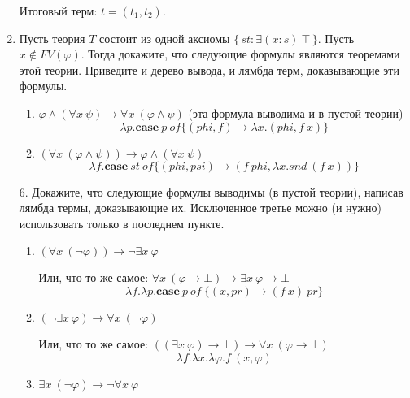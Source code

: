 \begin{enumerate}
Итоговый терм: $t = (t_1, t_2)$.

\item Пусть теория $T$ состоит из одной аксиомы $\{\,st : \exists (x : s)\ \top\,\}$.
    Пусть $x \notin FV(\varphi)$.
    Тогда докажите, что следующие формулы являются теоремами этой теории.
    Приведите и дерево вывода, и лямбда терм, доказывающие эти формулы.
\begin{enumerate}
\item $\varphi \land (\forall x\ \psi) \to \forall x\ (\varphi \land \psi)$ (эта формула выводима и в пустой 
теории)
\begin{equation*}
	\lambda p. \mathbf{case} \ p \ of \{ (phi, f) \to \lambda x.(phi, f \ x) \}
\end{equation*}
\item $(\forall x\ (\varphi \land \psi)) \to \varphi \land (\forall x\ \psi)$
\begin{equation*}
	\lambda f. \mathbf{case} \ st \ of \{ (phi, psi) \to (f\ phi, \lambda x. snd \ (f \ x)) \}
\end{equation*}
\end{enumerate}

\item[6.] Докажите, что следующие формулы выводимы (в пустой теории), написав лямбда термы, доказывающие их.
    Исключенное третье можно (и нужно) использовать только в последнем пункте.
\begin{enumerate}
\item $(\forall x\ (\neg \varphi)) \to \neg \exists x\ \varphi$

Или, что то же самое: $\forall x\ (\varphi \to \bot) \to \exists x\ \varphi \to \bot$
\begin{equation*}
	\lambda f.\lambda p. \mathbf{case} \ p \ of \ \{(x, pr) \to (f \ x) \ pr\}
\end{equation*}
\item $(\neg \exists x\ \varphi) \to \forall x\ (\neg \varphi)$

Или, что то же самое:  $((\exists x\ \varphi) \to \bot) \to \forall x\ (\varphi \to \bot)$
\begin{equation*}
	\lambda f.\lambda x. \lambda \varphi .f \ (x, \varphi) 
\end{equation*}
\item $\exists x\ (\neg \varphi) \to \neg \forall x\ \varphi$


\end{enumerate}
\end{enumerate}
